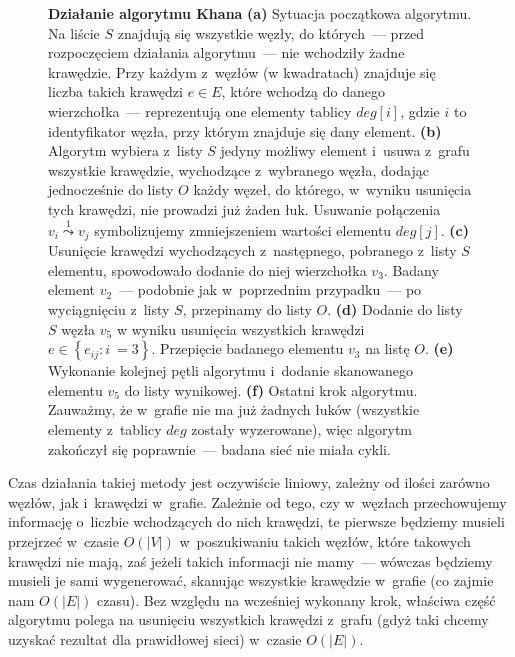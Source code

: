 \begin{figure}[!htbp]
\begin{subfigure}[b]{0.25\textwidth}
		\caption{}
	\end{subfigure}
	\caption{\textbf{Działanie algorytmu Khana} \textbf{(a)} Sytuacja początkowa algorytmu. Na liście $S$ znajdują się wszystkie węzły, do których~--- przed rozpoczęciem działania algorytmu~--- nie wchodziły żadne krawędzie. Przy każdym z~węzłów (w kwadratach) znajduje się liczba takich krawędzi $e \in E$, które wchodzą do danego wierzchołka~--- reprezentują one elementy tablicy $deg \left[ i \right]$, gdzie $i$ to identyfikator węzła, przy którym znajduje się dany element. \textbf{(b)} Algorytm wybiera z~listy $S$ jedyny możliwy element i~usuwa z~grafu wszystkie krawędzie, wychodzące z~wybranego węzła, dodając jednocześnie do listy $O$ każdy węzeł, do którego, w~wyniku usunięcia tych krawędzi, nie prowadzi już żaden łuk. Usuwanie połączenia $v_{i} \overset{1} \leadsto v_{j}$ symbolizujemy zmniejszeniem wartości elementu $deg \left[ j \right]$. \textbf{(c)} Usunięcie krawędzi wychodzących z~następnego, pobranego z~listy $S$ elementu, spowodowało dodanie do niej wierzchołka $v_{3}$. Badany element $v_{2}$~--- podobnie jak w~poprzednim przypadku~--- po wyciągnięciu z~listy $S$, przepinamy do listy $O$. \textbf{(d)} Dodanie do listy $S$ węzła $v_{5}$ w wyniku usunięcia wszystkich krawędzi $e \in \left\{ e_{ij} : i~= 3 \right\}$. Przepięcie badanego elementu $v_{3}$ na listę $O$. \textbf{(e)} Wykonanie kolejnej pętli algorytmu i~dodanie skanowanego elementu $v_{5}$ do listy wynikowej.  \textbf{(f)} Ostatni krok algorytmu. Zauważmy, że w~grafie nie ma już żadnych łuków (wszystkie elementy z~tablicy $deg$ zostały wyzerowane), więc algorytm zakończył się poprawnie~--- badana sieć nie miała cykli.} \label{fig:exampleKhan}
\end{figure}

Czas działania takiej metody jest oczywiście liniowy, zależny od ilości zarówno węzłów, jak i~krawędzi w~grafie. Zależnie od tego, czy w~węzłach przechowujemy informację o~liczbie wchodzących do nich krawędzi, te pierwsze będziemy musieli przejrzeć w~czasie $O \left( \left| V \right| \right)$ w~poszukiwaniu takich węzłów, które takowych krawędzi nie mają, zaś jeżeli takich informacji nie mamy~--- wówczas będziemy musieli je sami wygenerować, skanując wszystkie krawędzie w~grafie (co zajmie nam $O \left( \left| E \right| \right)$ czasu). Bez względu na wcześniej wykonany krok, właściwa część algorytmu polega na usunięciu wszystkich krawędzi z~grafu (gdyż taki chcemy uzyskać rezultat dla prawidłowej sieci) w~czasie $O \left( \left| E \right| \right)$.

